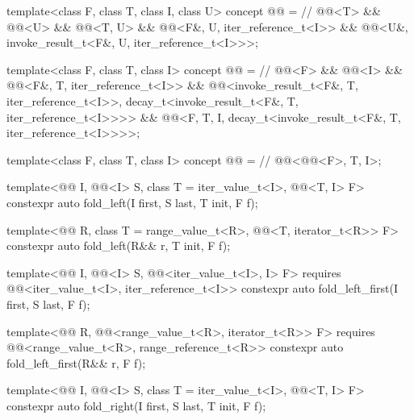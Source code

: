 \begin{codeblock}
{{    template<class F, class T, class I, class U>
      concept @@ =  // \expos
        @@<T> && @@<U> &&
        @@<T, U> && @@<F&, U, iter_reference_t<I>> &&
        @@<U&, invoke_result_t<F&, U, iter_reference_t<I>>>;

    template<class F, class T, class I>
      concept @@ =      // \expos
        @@<F> && @@<I> &&
        @@<F&, T, iter_reference_t<I>> &&
        @@<invoke_result_t<F&, T, iter_reference_t<I>>,
               decay_t<invoke_result_t<F&, T, iter_reference_t<I>>>> &&
        @@<F, T, I,
                        decay_t<invoke_result_t<F&, T, iter_reference_t<I>>>>;

    template<class F, class T, class I>
      concept @@ =    // \expos
        @@<@@<F>, T, I>;

    template<@@ I, @@<I> S, class T = iter_value_t<I>,
             @@<T, I> F>
      constexpr auto fold_left(I first, S last, T init, F f);

    template<@@ R, class T = range_value_t<R>,
             @@<T, iterator_t<R>> F>
      constexpr auto fold_left(R&& r, T init, F f);

    template<@@ I, @@<I> S,
             @@<iter_value_t<I>, I> F>
      requires @@<iter_value_t<I>, iter_reference_t<I>>
      constexpr auto fold_left_first(I first, S last, F f);

    template<@@ R, @@<range_value_t<R>, iterator_t<R>> F>
      requires @@<range_value_t<R>, range_reference_t<R>>
      constexpr auto fold_left_first(R&& r, F f);

    template<@@ I, @@<I> S, class T = iter_value_t<I>,
             @@<T, I> F>
      constexpr auto fold_right(I first, S last, T init, F f);

}}
\end{codeblock}

